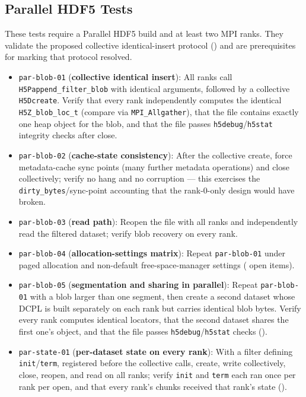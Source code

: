 \documentclass[../RFC-HDFG-2026-003.tex]{subfiles}
\begin{document}
\subsection{Parallel HDF5 Tests}
\label{sec:test-parallel}

These tests require a Parallel HDF5 build and at least two MPI ranks.
They validate the proposed collective identical-insert protocol
() and are prerequisites for marking that
protocol resolved.

\begin{itemize}
\item \texttt{par-blob-01} (\textbf{collective identical insert}): All
  ranks call \texttt{H5Pappend\_filter\_blob} with identical arguments,
  followed by a collective \texttt{H5Dcreate}. Verify that every rank
  independently computes the identical \texttt{H5Z\_blob\_loc\_t}
  (compare via \texttt{MPI\_Allgather}), that the file contains exactly
  one heap object for the blob, and that the file passes
  \texttt{h5debug}/\texttt{h5stat} integrity checks after close.
\item \texttt{par-blob-02} (\textbf{cache-state consistency}): After the
  collective create, force metadata-cache sync points (many further
  metadata operations) and close collectively; verify no hang and no
  corruption --- this exercises the \texttt{dirty\_bytes}/sync-point
  accounting that the rank-0-only design would have broken.
\item \texttt{par-blob-03} (\textbf{read path}): Reopen the file with all
  ranks and independently read the filtered dataset; verify blob
  recovery on every rank.
\item \texttt{par-blob-04} (\textbf{allocation-settings matrix}): Repeat
  \texttt{par-blob-01} under paged allocation and non-default
  free-space-manager settings ( open
  items).
\item \texttt{par-blob-05} (\textbf{segmentation and sharing in
  parallel}): Repeat \texttt{par-blob-01} with a blob larger than one
  segment, then create a second dataset whose DCPL is built separately
  on each rank but carries identical blob bytes.  Verify every rank
  computes identical locators, that the second dataset shares the first
  one's object, and that the file passes \texttt{h5debug}/\texttt{h5stat}
  checks ().
\item \texttt{par-state-01} (\textbf{per-dataset state on every rank}):
  With a filter defining \texttt{init}/\texttt{term}, registered before
  the collective calls, create, write collectively, close, reopen, and
  read on all ranks; verify \texttt{init} and \texttt{term} each ran once
  per rank per open, and that every rank's chunks received that rank's
  state ().
\end{itemize}
\end{document}
